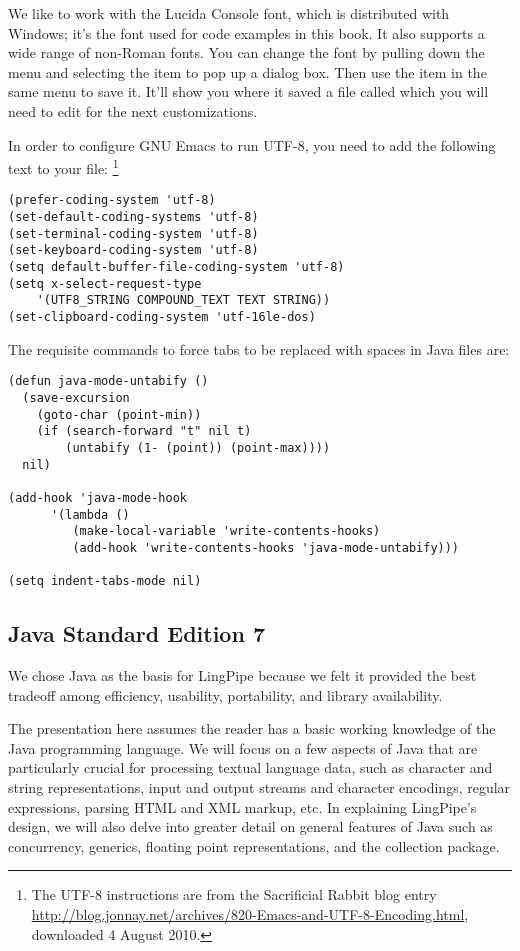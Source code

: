 We like to work with the Lucida Console font, which is distributed
with Windows; it's the font used for code examples in this book.  It
also supports a wide range of non-Roman fonts.  You can change the
font by pulling down the  menu and selecting the
 item to pop up a dialog box.  Then use
the  item in the same menu to save it.  It'll show
you where it saved a file called  which you will need
to edit for the next customizations.

In order to configure GNU Emacs to run UTF-8, you need to add
the following text to your  file:%
%
\footnote{The UTF-8 instructions are from the Sacrificial Rabbit blog entry
  \url{http://blog.jonnay.net/archives/820-Emacs-and-UTF-8-Encoding.html},
  downloaded 4 August 2010.}
%
\begin{verbatim}
(prefer-coding-system 'utf-8)
(set-default-coding-systems 'utf-8)
(set-terminal-coding-system 'utf-8)
(set-keyboard-coding-system 'utf-8)
(setq default-buffer-file-coding-system 'utf-8)
(setq x-select-request-type 
    '(UTF8_STRING COMPOUND_TEXT TEXT STRING))
(set-clipboard-coding-system 'utf-16le-dos)
\end{verbatim}
%
The requisite commands to force tabs to be replaced with spaces in
Java files are: 
%
\begin{verbatim}
(defun java-mode-untabify ()
  (save-excursion
    (goto-char (point-min))
    (if (search-forward "t" nil t)
        (untabify (1- (point)) (point-max))))
  nil)

(add-hook 'java-mode-hook
      '(lambda ()
         (make-local-variable 'write-contents-hooks)
         (add-hook 'write-contents-hooks 'java-mode-untabify)))

(setq indent-tabs-mode nil)
\end{verbatim}

\subsection{Java Standard Edition 7}

We chose Java as the basis for LingPipe because we felt it
provided the best tradeoff among efficiency, usability, portability,
and library availability.

The presentation here assumes the reader has a basic working knowledge
of the Java programming language.  We will focus on a few aspects of
Java that are particularly crucial for processing textual language
data, such as character and string representations, input and output
streams and character encodings, regular expressions, parsing HTML and
XML markup, etc.  In explaining LingPipe's design, we will also delve
into greater detail on general features of Java such as concurrency,
generics, floating point representations, and the collection package.

